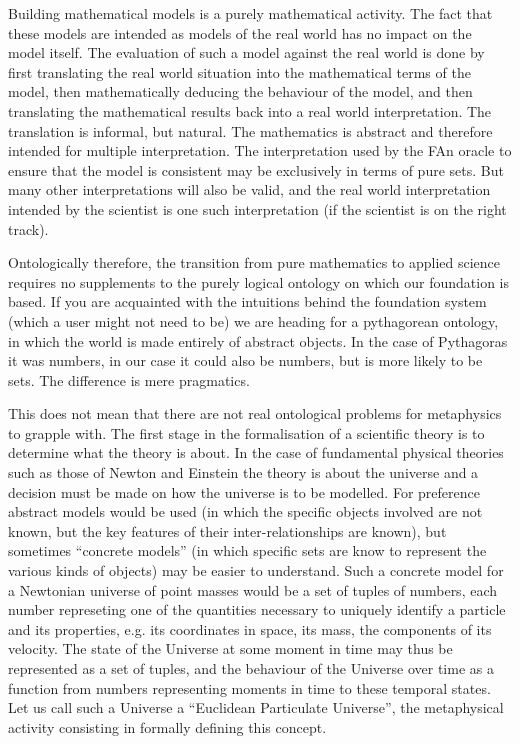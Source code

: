 Building mathematical models is a purely mathematical activity.
The fact that these models are intended as models of the real world has no impact on the model itself.
The evaluation of such a model against the real world is done by first translating the real world situation into the mathematical terms of the model, then mathematically deducing the behaviour of the model, and then translating the mathematical results back into a real world interpretation.
The translation is informal, but natural.
The mathematics is abstract and therefore intended for multiple interpretation.
The interpretation used by the FAn oracle to ensure that the model is consistent may be exclusively in terms of pure sets.
But many other interpretations will also be valid, and the real world interpretation intended by the scientist is one such interpretation (if the scientist is on the right track).

Ontologically therefore, the transition from pure mathematics to applied science requires no supplements to the purely logical ontology on which our foundation is based.
If you are acquainted with the intuitions behind the foundation system (which a user might not need to be) we are heading for a pythagorean ontology, in which the world is made entirely of abstract objects.
In the case of Pythagoras it was numbers, in our case it could also be numbers, but is more likely to be sets.
The difference is mere pragmatics.

This does not mean that there are not real ontological problems for metaphysics to grapple with.
The first stage in the formalisation of a scientific theory is to determine what the theory is about.
In the case of fundamental physical theories such as those of Newton and Einstein the theory is about the universe and a decision must be made on how the universe is to be modelled.
For preference abstract models would be used (in which the specific objects involved are not known, but the key features of their inter-relationships are known), but sometimes ``concrete models'' (in which specific sets are know to represent the various kinds of objects) may be easier to understand.
Such a concrete model for a Newtonian universe of point masses would be a set of tuples of numbers, each number represeting one of the quantities necessary to uniquely identify a particle and its properties, e.g. its coordinates in space, its mass, the components of its velocity.
The state of the Universe at some moment in time may thus be represented as a set of tuples, and the behaviour of the Universe over time as a function from numbers representing moments in time to these temporal states.
Let us call such a Universe a ``Euclidean Particulate Universe'', the metaphysical activity consisting in formally defining this concept.

